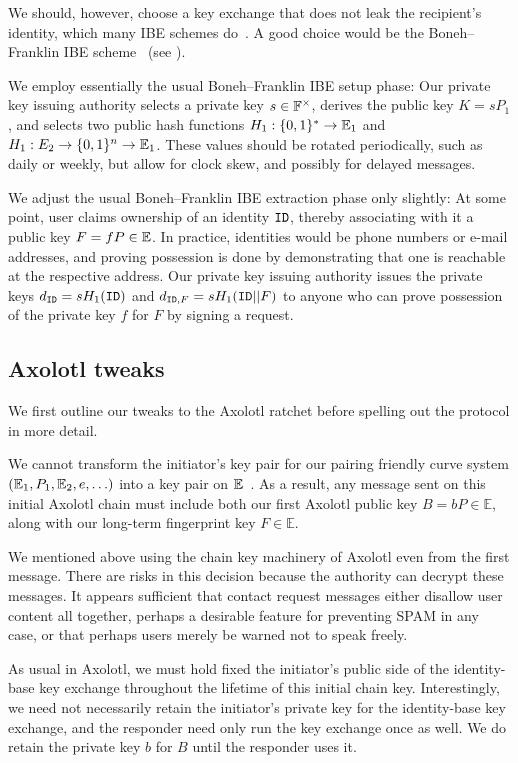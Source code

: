\documentclass[twoside,letterpaper]{sig-alternate}
\begin{document}
We should, however, choose a key exchange that does not leak the recipient's
identity, which many IBE schemes do~\cite{AnonIBE}.
A good choice would be the Boneh–Franklin IBE scheme~\cite{BF-IBE}
(see \cite[??]{BoyenMIBS}).

We employ essentially the usual Boneh–Franklin IBE setup phase:
Our private key issuing authority
 selects a private key $s \in \mathbb{F}^\times$,
 derives the public key $K = s P_1$, and
 selects two public hash functions
  $H_1 : \{0,1\}^* \to \mathbb{E}_1$ and $H_1 : E_2 \to \{0,1\}^n \to \mathbb{E}_1$.
These values should be rotated periodically, such as daily or weekly,
but allow for clock skew, and possibly for delayed messages.

We adjust the usual Boneh–Franklin IBE extraction phase only slightly:
At some point, user claims ownership of an identity $\mathtt{ID}$, thereby
 associating with it a public key $F = f P \in \mathbb{E}$.
In practice, identities would be phone numbers or e-mail addresses,
and proving possession is done by demonstrating that
one is reachable at the respective address.
Our private key issuing authority issues
 the private keys $d_{\mathtt{ID}} = s H_1(\mathtt{ID})$ and $d_{\mathtt{ID},F} = s H_1(\mathtt{ID} || F)$
to anyone who can prove possession of the private key $f$ for $F$
 by signing a request. 

\subsection{Axolotl tweaks} %

We first outline our tweaks to the Axolotl ratchet before
 spelling out the protocol in more detail.

We cannot transform the initiator's key pair for
 our pairing friendly curve system $(\mathbb{E}_1,P_1,\mathbb{E}_2,e,\ldots)$
into a key pair on $\mathbb{E}$~\cite{??no_homomorphism??}.
As a result, any message sent on this initial Axolotl chain must include
both our first Axolotl public key $B = b P \in \mathbb{E}$,
 along with our long-term fingerprint key $F \in \mathbb{E}$.

We mentioned above using the chain key machinery of Axolotl even from
the first message.  There are risks in this decision because the
authority can decrypt these messages.  It appears sufficient that
contact request messages either disallow user content all together,
perhaps a desirable feature for preventing SPAM in any case, or that
perhaps users merely be warned not to speak freely.

As usual in Axolotl, we must hold fixed the initiator's public side of
the identity-base key exchange throughout the lifetime of this initial
chain key.  Interestingly, we need not necessarily retain the
initiator's private key for the identity-base key exchange, and
 the responder need only run the key exchange once as well.
We do retain the private key $b$ for $B$ until the responder uses it.
\end{document}
